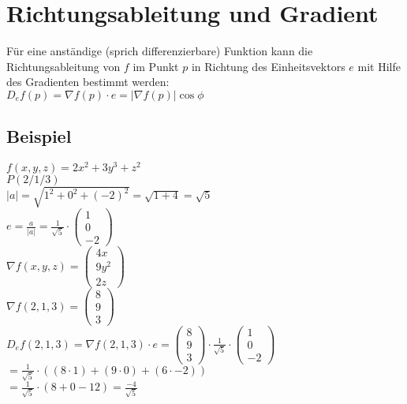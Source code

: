 \documentclass[../main.tex]{subfiles}
\begin{document}
\section{Richtungsableitung und Gradient}
\label{sec:Richtungsableitung_Gradient}
Für eine anständige (sprich differenzierbare) Funktion kann die Richtungsableitung von $f$
im Punkt $p$ in Richtung des Einheitsvektors $e$ mit Hilfe des Gradienten bestimmt werden: \\ [7pt]
$D_ef(p)=\nabla f(p)\cdot e=|\nabla f(p)|\cos\phi$

\subsection{Beispiel}
$f(x,y,z)=2x^2+3y^3+z^2$ \\ [7pt]
$P(2/1/3)$ \\ [7pt]
$|a|=\sqrt{1^2+0^2+(-2)^2}=\sqrt{1+4}=\sqrt{5}$ \\ [7pt]
$e=\frac{a}{|a|}=\frac{1}{\sqrt{5}}\cdot\begin{pmatrix}1\\0\\-2\end{pmatrix}$ \\
$\nabla f(x,y,z)=\begin{pmatrix}4x\\9y^2\\2z\end{pmatrix}$ \\ [7pt]
$\nabla f(2,1,3)=\begin{pmatrix}8\\9\\3\end{pmatrix}$ \\ [7pt]
$D_ef(2,1,3)=\nabla f(2,1,3)\cdot e = \begin{pmatrix}8\\9\\3\end{pmatrix} \cdot \frac{1}{\sqrt{5}}\cdot\begin{pmatrix}1\\0\\-2\end{pmatrix}$
$= \frac{1}{\sqrt{5}}\cdot((8\cdot1)+(9\cdot0)+(6\cdot-2))$ \\ [7pt]
$= \frac{1}{\sqrt{5}}\cdot(8+0-12)=\frac{-4}{\sqrt{5}}$
\end{document}
